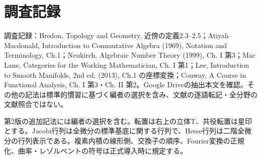 \documentclass[a5paper,10pt,dvipdfmx]{jsarticle}
\begin{document}
\section{調査記録}
調査記録：Bredon, Topology and Geometry, 近傍の定義2.3--2.5；Atiyah--Macdonald, Introduction to Commutative Algebra (1969), Notation and Terminology, Ch.1；Neukirch, Algebraic Number Theory (1999), Ch. I 第3；Mac Lane, Categories for the Working Mathematician, Ch. I 第1；Lee, Introduction to Smooth Manifolds, 2nd ed. (2013), Ch.1 の座標変換；Conway, A Course in Functional Analysis, Ch. I 第3・Ch. II 第2。Google Driveの抽出本文を確認。その他の記法は標準的慣習に基づく編者の選択を含み、文献の逐語転記・全分野の文献照合ではない。

第2版の追加記法には編者の選択を含む。転置は右上の立体T、共役転置は星印とする。Jacobi行列は全微分の標準基底に関する行列で、Hesse行列は二階全微分の行列表示である。複素内積の線形側、交換子の順序、Fourier変換の正規化、曲率・レゾルベントの符号は正式導入時に規定する。
\end{document}

